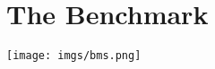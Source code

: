 \section{The \bm Benchmark}
\label{sec:bm_challenge}

\begin{figure*}[ht]
    \centering
    \texttt{[image: imgs/bms.png]} 

\end{figure*}
